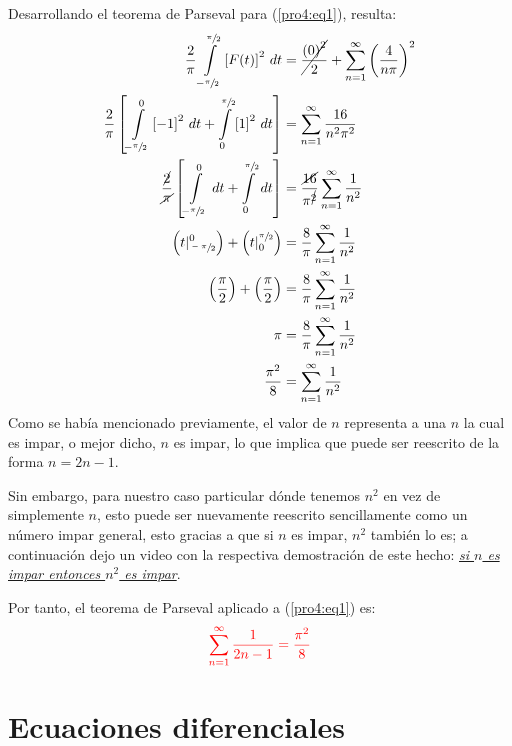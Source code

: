 \begin{multicols}{2}
Desarrollando el teorema de Parseval para (\ref{pro4:eq1}), resulta:
\begin{align*}
    \frac{2}{\pi} \int\limits_{-\sfrac{\pi}{2}}^{\sfrac{\pi}{2}} \left[F(t)\right]^{2} \,dt &= \cancel{\frac{\left(0\right)^{2}}{2}} + \sum_{n=1}^{\infty} \left(\frac{4}{n\pi}\right)^{2}\\
    \frac{2}{\pi} \left[\int\limits_{-\sfrac{\pi}{2}}^{0} \left[-1\right]^{2} \,dt + \int\limits_{0}^{\sfrac{\pi}{2}} \left[1\right]^{2} \,dt\right] &= \sum_{n=1}^{\infty} \frac{16}{n^{2}\pi^{2}}\\
    \frac{\cancel{2}}{\cancel{\pi}} \left[\int\limits_{-\sfrac{\pi}{2}}^{0} \,dt + \int\limits_{0}^{\sfrac{\pi}{2}} \,dt\right] &= \frac{\cancel{16}}{\pi^{\cancel{2}}} \sum_{n=1}^{\infty} \frac{1}{n^{2}}\\
    \left(t \vert_{\sfrac{-\pi}{2}}^{0}\right) + \left(t \vert_{0}^{\sfrac{\pi}{2}}\right) &= \frac{8}{\pi} \sum_{n=1}^{\infty} \frac{1}{n^{2}}\\
    \left(\frac{\pi}{2}\right) + \left(\frac{\pi}{2}\right) &= \frac{8}{\pi} \sum_{n=1}^{\infty} \frac{1}{n^{2}}\\
    \pi &= \frac{8}{\pi} \sum_{n=1}^{\infty} \frac{1}{n^{2}}\\
    \frac{\pi^{2}}{8} &= \sum_{n=1}^{\infty} \frac{1}{n^{2}}
\end{align*}
Como se había mencionado previamente, el valor de $n$ representa a una $n$ la cual es impar, o mejor dicho, $n$ es impar, lo que implica que puede ser reescrito de la forma $n = 2n-1$. 

Sin embargo, para nuestro caso particular dónde tenemos $n^{2}$ en vez de simplemente $n$, esto puede ser nuevamente reescrito sencillamente como un número impar general, esto gracias a que si $n$ es impar, $n^{2}$ también lo es; a continuación dejo un video con la respectiva demostración de este hecho: \href{https://youtu.be/XMB3Aa6SscQ}{\textit{si $n$ es impar entonces $n^{2}$ es impar}}.

Por tanto, el teorema de Parseval aplicado a (\ref{pro4:eq1}) es:
\begin{equation}
    \textcolor{rojo}{\sum_{n=1}^{\infty} \frac{1}{2n-1} = \frac{\pi^{2}}{8}} \label{pro4:res1}
\end{equation}

\section{Ecuaciones diferenciales}


\end{multicols}
